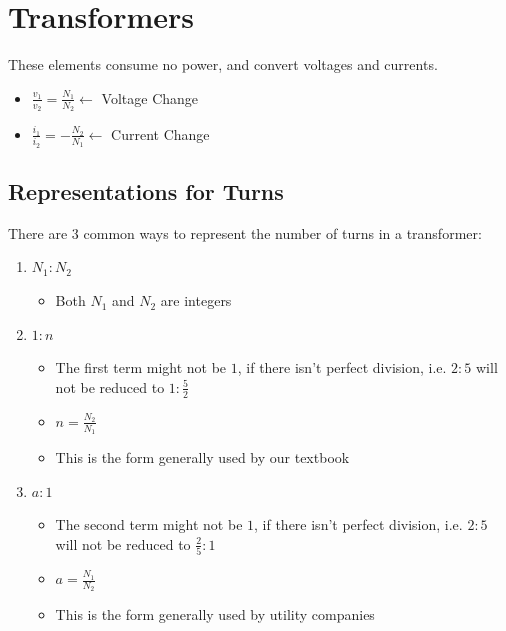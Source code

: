 \documentclass[10pt,letterpaper,final,twoside,notitlepage]{article}
\begin{document}
\section*{Transformers} \label{sec:Transformers}
These elements consume no power, and convert voltages and currents.
\begin{itemize}[noitemsep, nolistsep]
	\item $\frac{v_{1}}{v_{2}} = \frac{N_{1}}{N_{2}} \longleftarrow$ Voltage Change
	\item $\frac{i_{1}}{i_{2}} = -\frac{N_{2}}{N_{1}} \longleftarrow$ Current Change
\end{itemize}

	\subsection*{Representations for Turns} \label{subsec:Turn Representations}
		There are 3 common ways to represent the number of turns in a transformer:
		\begin{enumerate}
			\item $N_{1} : N_{2}$
			\begin{itemize}[noitemsep, nolistsep]
				\item Both $N_{1}$ and $N_{2}$ are integers
			\end{itemize}
			\item $1 : n$
			\begin{itemize}[noitemsep, nolistsep]
				\item The first term might not be $1$, if there isn't perfect division, i.e. $2 : 5$ will not be reduced to $1 : \frac{5}{2}$
				\item $n = \frac{N_{2}}{N_{1}}$
				\item This is the form generally used by our textbook
			\end{itemize}
			\item $a : 1$
			\begin{itemize}[noitemsep, nolistsep]
				\item The second term might not be $1$, if there isn't perfect division, i.e. $2 : 5$ will not be reduced to $\frac{2}{5} : 1$
				\item $a = \frac{N_{1}}{N_{2}}$
				\item This is the form generally used by utility companies
			\end{itemize}
		\end{enumerate}
	
\end{document}
